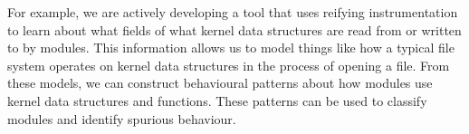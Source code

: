 \documentclass{sigplanconf}
\begin{document}





For example, we are actively developing a tool that uses reifying instrumentation to learn about what fields of what kernel data structures are read from or written to by modules. This information allows us to model things like how a typical file system operates on kernel data structures in the process of opening a file. From these models, we can construct behavioural patterns about how modules use kernel data structures and functions. These patterns can be used to classify modules and identify spurious behaviour.
\end{document}
